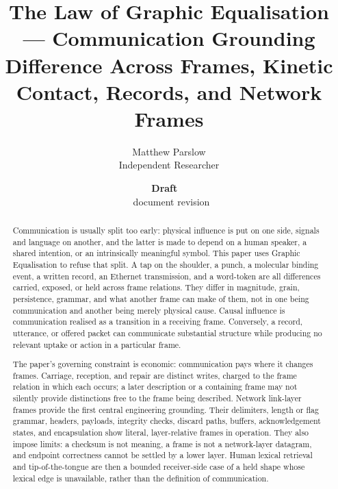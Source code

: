 \documentclass[11pt,a4paper]{article}
\title{The Law of Graphic Equalisation --- Communication Grounding\\\large Difference Across Frames, Kinetic Contact, Records, and Network Frames}
\author{Matthew Parslow\\Independent Researcher}
\date{\textbf{Draft \texorpdfstring{\textemdash}{---}\ \PaperDraft}\\[2pt]\PaperDisplayDate \texorpdfstring{\textbullet}{\textperiodcentered}\ document revision \PaperRevision}
\theoremstyle{remark}\newtheorem{remark}[definition]{Remark}
\begin{document}
\maketitle
\begin{center}
\end{center}
\vspace{1em}

\begin{abstract}
Communication is usually split too early: physical influence is put on one side,
signals and language on another, and the latter is made to depend on a human
speaker, a shared intention, or an intrinsically meaningful symbol. This paper
uses Graphic Equalisation to refuse that split. A tap on the shoulder, a punch,
a molecular binding event, a written record, an Ethernet transmission, and a
word-token are all differences carried, exposed, or held across frame relations.
They differ in magnitude, grain, persistence, grammar, and what another frame
can make of them, not in one being communication and another being merely
physical cause. Causal influence is communication realised as a transition in a
receiving frame. Conversely, a record, utterance, or offered packet can
communicate substantial structure while producing no relevant uptake or action
in a particular frame.

The paper's governing constraint is economic: communication pays where it
changes frames. Carriage, reception, and repair are distinct writes, charged to
the frame relation in which each occurs; a later description or a containing
frame may not silently provide distinctions free to the frame being described.
Network link-layer frames provide the first central engineering grounding.
Their delimiters, length or flag grammar, headers, payloads, integrity checks,
discard paths, buffers, acknowledgement states, and encapsulation show literal,
layer-relative frames in operation. They also impose limits: a checksum is not
meaning, a frame is not a network-layer datagram, and endpoint correctness cannot
be settled by a lower layer. Human lexical retrieval and tip-of-the-tongue are
then a bounded receiver-side case of a held shape whose lexical edge is
unavailable, rather than the definition of communication.
\end{abstract}
\end{document}
